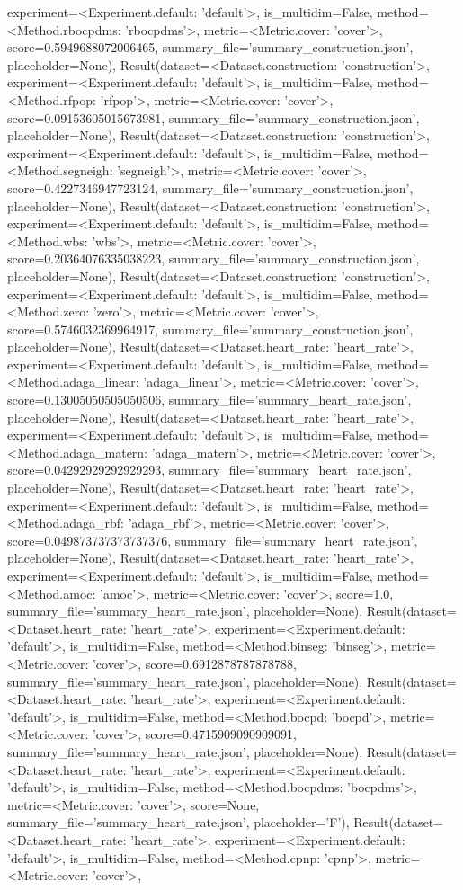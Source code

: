 experiment=<Experiment.default: 'default'>, is_multidim=False, method=<Method.rbocpdms: 'rbocpdms'>, metric=<Metric.cover: 'cover'>, score=0.5949688072006465, summary_file='summary_construction.json', placeholder=None), Result(dataset=<Dataset.construction: 'construction'>, experiment=<Experiment.default: 'default'>, is_multidim=False, method=<Method.rfpop: 'rfpop'>, metric=<Metric.cover: 'cover'>, score=0.09153605015673981, summary_file='summary_construction.json', placeholder=None), Result(dataset=<Dataset.construction: 'construction'>, experiment=<Experiment.default: 'default'>, is_multidim=False, method=<Method.segneigh: 'segneigh'>, metric=<Metric.cover: 'cover'>, score=0.4227346947723124, summary_file='summary_construction.json', placeholder=None), Result(dataset=<Dataset.construction: 'construction'>, experiment=<Experiment.default: 'default'>, is_multidim=False, method=<Method.wbs: 'wbs'>, metric=<Metric.cover: 'cover'>, score=0.20364076335038223, summary_file='summary_construction.json', placeholder=None), Result(dataset=<Dataset.construction: 'construction'>, experiment=<Experiment.default: 'default'>, is_multidim=False, method=<Method.zero: 'zero'>, metric=<Metric.cover: 'cover'>, score=0.5746032369964917, summary_file='summary_construction.json', placeholder=None), Result(dataset=<Dataset.heart_rate: 'heart_rate'>, experiment=<Experiment.default: 'default'>, is_multidim=False, method=<Method.adaga_linear: 'adaga_linear'>, metric=<Metric.cover: 'cover'>, score=0.13005050505050506, summary_file='summary_heart_rate.json', placeholder=None), Result(dataset=<Dataset.heart_rate: 'heart_rate'>, experiment=<Experiment.default: 'default'>, is_multidim=False, method=<Method.adaga_matern: 'adaga_matern'>, metric=<Metric.cover: 'cover'>, score=0.04292929292929293, summary_file='summary_heart_rate.json', placeholder=None), Result(dataset=<Dataset.heart_rate: 'heart_rate'>, experiment=<Experiment.default: 'default'>, is_multidim=False, method=<Method.adaga_rbf: 'adaga_rbf'>, metric=<Metric.cover: 'cover'>, score=0.049873737373737376, summary_file='summary_heart_rate.json', placeholder=None), Result(dataset=<Dataset.heart_rate: 'heart_rate'>, experiment=<Experiment.default: 'default'>, is_multidim=False, method=<Method.amoc: 'amoc'>, metric=<Metric.cover: 'cover'>, score=1.0, summary_file='summary_heart_rate.json', placeholder=None), Result(dataset=<Dataset.heart_rate: 'heart_rate'>, experiment=<Experiment.default: 'default'>, is_multidim=False, method=<Method.binseg: 'binseg'>, metric=<Metric.cover: 'cover'>, score=0.6912878787878788, summary_file='summary_heart_rate.json', placeholder=None), Result(dataset=<Dataset.heart_rate: 'heart_rate'>, experiment=<Experiment.default: 'default'>, is_multidim=False, method=<Method.bocpd: 'bocpd'>, metric=<Metric.cover: 'cover'>, score=0.4715909090909091, summary_file='summary_heart_rate.json', placeholder=None), Result(dataset=<Dataset.heart_rate: 'heart_rate'>, experiment=<Experiment.default: 'default'>, is_multidim=False, method=<Method.bocpdms: 'bocpdms'>, metric=<Metric.cover: 'cover'>, score=None, summary_file='summary_heart_rate.json', placeholder='F'), Result(dataset=<Dataset.heart_rate: 'heart_rate'>, experiment=<Experiment.default: 'default'>, is_multidim=False, method=<Method.cpnp: 'cpnp'>, metric=<Metric.cover: 'cover'>, 